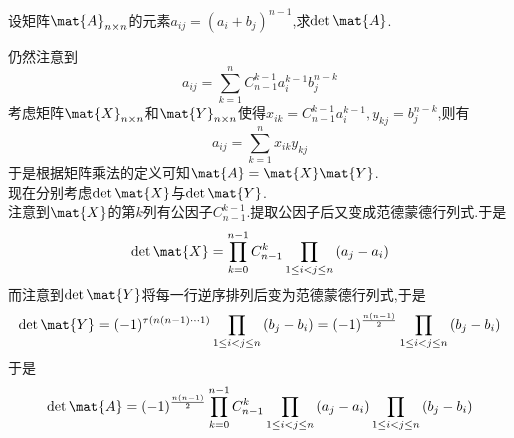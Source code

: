 \documentclass{ctexart}
\begin{document}
\begin{problem}
    设矩阵$\mat{A}_{n\times n}$的元素$a_{ij}=\left(a_i+b_j\right)^{n-1}$,求$\det\mat{A}$.
\end{problem}
\begin{solution}
    仍然注意到
    \[a_{ij}=\sum_{k=1}^{n}C_{n-1}^{k-1}a_i^{k-1}b_j^{n-k}\]
    考虑矩阵$\mat{X}_{n\times n}$和$\mat{Y}_{n\times n}$使得$x_{ik}=C_{n-1}^{k-1}a_i^{k-1},y_{kj}=b_j^{n-k}$,则有
    \[a_{ij}=\sum_{k=1}^{n}x_{ik}y_{kj}\]
    于是根据矩阵乘法的定义可知$\mat{A}=\mat{X}\mat{Y}$.\\
    现在分别考虑$\det\mat{X}$与$\det\mat{Y}$.\\
    注意到$\mat{X}$的第$k$列有公因子$C_{n-1}^{k-1}$.提取公因子后又变成范德蒙德行列式.于是
    \[\det\mat{X}=\prod_{k=0}^{n-1}C_{n-1}^{k}\prod_{1\leq i<j\leq n}\left(a_j-a_i\right)\]
    而注意到$\det\mat{Y}$将每一行逆序排列后变为范德蒙德行列式,于是
    \[\det\mat{Y}=(-1)^{\tau\left(n(n-1)\cdots1\right)}\prod_{1\leq i<j\leq n}\left(b_j-b_i\right)=(-1)^{\frac{n(n-1)}{2}}\prod_{1\leq i<j\leq n}\left(b_j-b_i\right)\]
    于是
    \[\det\mat{A}=(-1)^{\frac{n(n-1)}{2}}\prod_{k=0}^{n-1}C_{n-1}^{k}\prod_{1\leq i<j\leq n}\left(a_j-a_i\right)\prod_{1\leq i<j\leq n}\left(b_j-b_i\right)\]
\end{solution}
\end{document}
